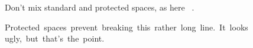 Don't mix standard and protected spaces, as here ~\cite{smith14}.

Protected~spaces~prevent~breaking~this~rather~long~line.~It~looks~
ugly,~but~that's~the~point.

